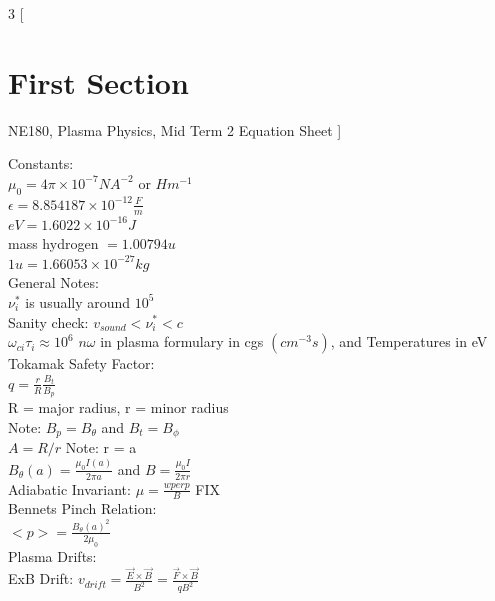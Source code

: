 \documentclass[10pt]{extarticle}
\begin{document}
\begin{multicols}{3}
[
\section{First Section}
NE180, Plasma Physics, Mid Term 2 Equation Sheet
]

Constants:\\
$\mu_{0} = 4 \pi \times 10 ^{-7} NA^{-2}$ or $Hm^{-1} $\\
$\epsilon = 8.854187 \times 10 ^{-12} \frac{F}{m}$\\	
$eV = 1.6022\times 10 ^{-16} J$\\
mass hydrogen $ = 1.00794u  $\\
$1u = 1.66053 \times 10^{-27} kg $\\

General Notes:\\
$\nu_{i}^{*}$ is usually around $10^{5}$\\
Sanity check: $v_{sound}<\nu_{i}^{*}<c$\\
$\omega_{ci}\tau_{i} \approx 10^{6}$
$n\omega$ in plasma formulary in cgs $(cm^{-3}s)$, and Temperatures in eV\\

Tokamak Safety Factor:\\
$q = \frac{r}{R}\frac{B_{t}}{B_{p}}$\\
R =  major radius, r = minor radius\\
Note: $B_{p} = B_{\theta}$ and $B_{t} = B_{\phi}$\\
$A = R / r$ Note: r = a\\
$B_{\theta}(a) = \frac{\mu_{0}I(a)}{2 \pi a}$ and $B = \frac{\mu_{0}I}{2\pi r}$\\
Adiabatic Invariant: $\mu = \frac{wperp}{B}$ FIX\\

Bennets Pinch Relation: \\
$<p> = \frac{B_{\theta}(a)^{2}}{2\mu_{0}}$\\

Plasma Drifts:\\
ExB Drift: $v_{drift} = \frac{\vec{E}\times\vec{B}}{B^{2}} = \frac{\vec{F}\times\vec{B}}{qB^{2}}$\\
 

\end{multicols}
\end{document}
